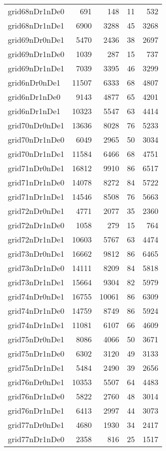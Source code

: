 \begin{longtable}{lrrrr}
grid68nDr1nDe0 & 691 & 148 & 11 & 532 \\
grid68nDr1nDe1 & 6900 & 3288 & 45 & 3268 \\
grid69nDr0nDe1 & 5470 & 2436 & 38 & 2697 \\
grid69nDr1nDe0 & 1039 & 287 & 15 & 737 \\
grid69nDr1nDe1 & 7039 & 3395 & 46 & 3299 \\
grid6nDr0nDe1 & 11507 & 6333 & 68 & 4807 \\
grid6nDr1nDe0 & 9143 & 4877 & 65 & 4201 \\
grid6nDr1nDe1 & 10323 & 5547 & 63 & 4414 \\
grid70nDr0nDe1 & 13636 & 8028 & 76 & 5233 \\
grid70nDr1nDe0 & 6049 & 2965 & 50 & 3034 \\
grid70nDr1nDe1 & 11584 & 6466 & 68 & 4751 \\
grid71nDr0nDe1 & 16812 & 9910 & 86 & 6517 \\
grid71nDr1nDe0 & 14078 & 8272 & 84 & 5722 \\
grid71nDr1nDe1 & 14546 & 8508 & 76 & 5663 \\
grid72nDr0nDe1 & 4771 & 2077 & 35 & 2360 \\
grid72nDr1nDe0 & 1058 & 279 & 15 & 764 \\
grid72nDr1nDe1 & 10603 & 5767 & 63 & 4474 \\
grid73nDr0nDe1 & 16662 & 9812 & 86 & 6465 \\
grid73nDr1nDe0 & 14111 & 8209 & 84 & 5818 \\
grid73nDr1nDe1 & 15664 & 9304 & 82 & 5979 \\
grid74nDr0nDe1 & 16755 & 10061 & 86 & 6309 \\
grid74nDr1nDe0 & 14759 & 8749 & 86 & 5924 \\
grid74nDr1nDe1 & 11081 & 6107 & 66 & 4609 \\
grid75nDr0nDe1 & 8086 & 4066 & 50 & 3671 \\
grid75nDr1nDe0 & 6302 & 3120 & 49 & 3133 \\
grid75nDr1nDe1 & 5484 & 2490 & 39 & 2656 \\
grid76nDr0nDe1 & 10353 & 5507 & 64 & 4483 \\
grid76nDr1nDe0 & 5822 & 2760 & 48 & 3014 \\
grid76nDr1nDe1 & 6413 & 2997 & 44 & 3073 \\
grid77nDr0nDe1 & 4680 & 1930 & 34 & 2417 \\
grid77nDr1nDe0 & 2358 & 816 & 25 & 1517 \\

\end{longtable}

